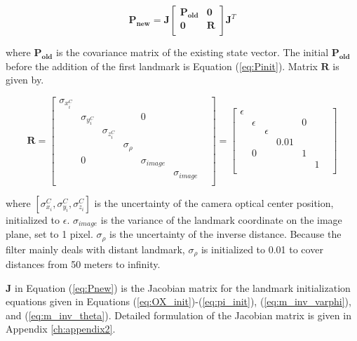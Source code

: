 \begin{equation}
\label{eq:Pnew}
\boldsymbol{P_{new}}=\boldsymbol{J}\begin{bmatrix}
\boldsymbol{P_{old}} & \boldsymbol{0} \\
\boldsymbol{0} & \boldsymbol{R} \\
\end{bmatrix}
\boldsymbol{J}^{T}
\end{equation}

\noindent where $\boldsymbol{P_{old}}$ is the covariance matrix of the existing
state vector. The initial $\boldsymbol{P_{old}}$ before the addition of the first landmark is Equation (\ref{eq:Pinit}). Matrix $\boldsymbol{R}$ is given by.

\begin{equation}
\label{eq:R}
\boldsymbol{R}=\begin{bmatrix}
\sigma _{x_{i}^{C}} & & & & & & \\
 & \sigma _{y_{i}^{C}} & & & 0 & & \\
 & & \sigma _{z_{i}^{C}} & & & & \\
 & & & \sigma _{\rho } & & & \\
 & 0 & & & \sigma _{image} & & \\
 & & & & & \sigma _{image} & \\
\end{bmatrix}
 = \begin{bmatrix}
\epsilon & & & & & & \\
 & \epsilon & & & 0 & & \\
 & & \epsilon & & & & \\
 & & & 0.01 & & & \\
 & 0 & & & 1 & & \\
 & & & & & 1 & \\
\end{bmatrix} 
\end{equation}

\noindent where $[\sigma_{x_{i}}^{C}, \sigma_{y_{i}}^{C}, \sigma
_{z_{i}}^{C}]$ is the uncertainty of the camera optical center
position, initialized to $\epsilon$. $\sigma_{image}$ is the variance
of the landmark coordinate on the image plane, set to 1 pixel. $\sigma
_{\rho }$ is the uncertainty of the inverse distance. Because the
filter mainly deals with distant landmark, $ \sigma _{\rho }$ is
initialized to 0.01 to cover distances from 50 meters to infinity.

$\boldsymbol{J}$ in Equation (\ref{eq:Pnew}) is the Jacobian matrix
for the landmark initialization equations given in Equations
(\ref{eq:OX_init})-(\ref{eq:pi_init}), (\ref{eq:m_inv_varphi}), and
(\ref{eq:m_inv_theta}). Detailed formulation of the Jacobian matrix is
given in Appendix \ref{ch:appendix2}.



